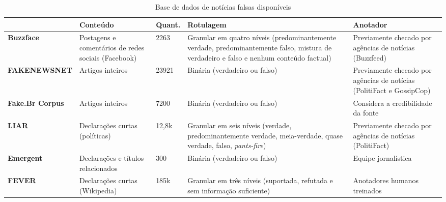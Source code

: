 \documentclass{SBCbookchapter}
\begin{document}
\begin{table} [tb!]
\label{tab:datasets}
\footnotesize
\centering
\caption{Base de dados de notícias falsas disponíveis}
\begin{tabular}{|M{.18\textwidth}|M{.14\textwidth}|M{.07\textwidth}|M{.3\textwidth}|M{.12\textwidth}|} 
  & \textbf{Conteúdo}             & \textbf{Quant.} & \textbf{Rotulagem}                                                                                                 & \textbf{Anotador}                               \\ 
\hline 
\textbf{Buzzface} \cite{santia2018buzzface}              & Postagens e comentários de redes sociais (Facebook) & 2263            & Granular em quatro níveis (predominantemente verdade, predominantemente falso, mistura de verdadeiro e falso e nenhum conteúdo factual) & Previamente checado por agências de notícias (Buzzfeed)                \\ 
\hline
\textbf{FAKENEWSNET} \cite{shu2020fakenewsnet}           & Artigos inteiros                                    & 23921           & Binária (verdadeiro ou falso)                                                                                                           & Previamente checado por agências de notícias (PolitiFact e GossipCop)  \\ 
\hline
\textbf{Fake.Br Corpus} \cite{monteiro2018contributions} & Artigos inteiros                                    & 7200            & Binária (verdadeiro ou falso)                                                                                                           & Considera a credibilidade da fonte                                     \\ 
\hline
\textbf{LIAR} \cite{wang2017liar}                        & Declarações curtas (políticas)                      & 12,8k           & Granular em seis níveis (verdade, predominantemente verdade, meia-verdade, quase verdade, falso, \textit{pants-fire})                            & Previamente checado por agências de notícias (PolitiFact)              \\ 
\hline
\textbf{Emergent} \cite{ferreira2016emergent}            & Declarações e títulos relacionados                  & 300             & Binária (verdadeiro ou falso)                                                                                                           & Equipe jornalística                                                    \\ 
\hline
\textbf{FEVER} \cite{thorne-etal-2018-fever}             & Declarações curtas (Wikipedia)                      & 185k            & Granular em três níveis (suportada, refutada e sem informação suficiente)                                                               & Anotadores humanos treinados                                           \\ 

\end{tabular}
\end{table}
\end{document}
